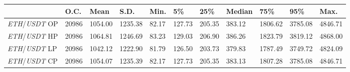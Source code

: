 \begin{tabular}{lllllllllll}
\toprule
 & \textbf{O.C.} & \textbf{Mean} & \textbf{S.D.} & \textbf{Min.} & \textbf{5\%} & \textbf{25\%} & \textbf{Median} & \textbf{75\%} & \textbf{95\%} & \textbf{Max.} \\
\midrule
\emph{ETH}/\emph{USDT} OP & 20986 & 1054.00 & 1235.38 & 82.17 & 127.73 & 205.35 & 383.12 & 1806.62 & 3785.08 & 4846.71 \\
\emph{ETH}/\emph{USDT} HP & 20986 & 1064.81 & 1246.69 & 83.23 & 129.03 & 206.90 & 386.26 & 1823.79 & 3819.12 & 4868.00 \\
\emph{ETH}/\emph{USDT} LP & 20986 & 1042.12 & 1222.90 & 81.79 & 126.50 & 203.73 & 379.83 & 1787.49 & 3749.72 & 4824.09 \\
\emph{ETH}/\emph{USDT} CP & 20986 & 1054.07 & 1235.39 & 82.17 & 127.73 & 205.35 & 383.13 & 1807.28 & 3785.08 & 4846.71 \\
\bottomrule
\end{tabular}
